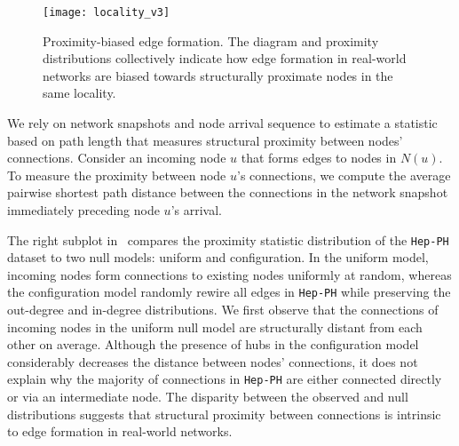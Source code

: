 

\begin{figure}[!htbp]
 \centering
 \texttt{[image: locality\_v3]}
 \caption{
    Proximity-biased edge formation. The diagram and proximity distributions
    collectively indicate how edge formation in real-world networks are biased
    towards structurally proximate nodes in the same locality.  }
 \label{fig:locality}
 \vspace{-10pt}
\end{figure}


We rely on network snapshots and
node arrival sequence to estimate a statistic based on path length that measures
structural proximity between nodes' connections. Consider an incoming node $u$ that forms edges to nodes in $N(u)$.
To measure the proximity between node $u$'s connections, we compute the average
pairwise shortest path distance between the connections in the network snapshot
immediately preceding node $u$'s arrival.

The right subplot in~ compares the proximity statistic
distribution of the \texttt{Hep-PH} dataset to two null models: uniform and
configuration. In the uniform model, incoming nodes form connections to existing
nodes uniformly at random, whereas the configuration model  randomly
rewire all edges in \texttt{Hep-PH} while preserving the out-degree and in-degree
distributions. We first observe that the connections of incoming nodes in the uniform
null model are structurally distant from each other on average.
Although the presence of hubs in the configuration model
considerably decreases the distance between nodes' connections, it does
not explain why the majority of connections in \texttt{Hep-PH} are either
connected directly or via an intermediate node. The disparity between the
observed and null distributions suggests that structural proximity between
connections is intrinsic to edge formation in real-world networks.





